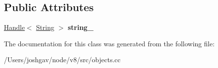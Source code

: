 \subsection*{Public Attributes}
\begin{DoxyCompactItemize}
\item 
\hyperlink{classv8_1_1internal_1_1_handle}{Handle}$<$ \hyperlink{classv8_1_1internal_1_1_string}{String} $>$ {\bfseries string\+\_\+}\hypertarget{classv8_1_1internal_1_1_internalized_string_key_a2a11ac2998b5260e60c74354f8f3a9f5}{}\label{classv8_1_1internal_1_1_internalized_string_key_a2a11ac2998b5260e60c74354f8f3a9f5}

\end{DoxyCompactItemize}


The documentation for this class was generated from the following file\+:\begin{DoxyCompactItemize}
\item 
/\+Users/joshgav/node/v8/src/objects.\+cc\end{DoxyCompactItemize}
